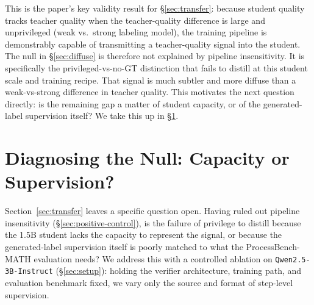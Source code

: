 \documentclass{article}
\begin{document}
This is the paper's key validity result for \S\ref{sec:transfer}: because
student quality tracks teacher quality when the teacher-quality difference
is large and unprivileged (weak vs.\ strong labeling model), the training
pipeline is demonstrably capable of transmitting a teacher-quality signal
into the student. The null in \S\ref{sec:diffuse} is therefore not explained
by pipeline insensitivity. It is specifically the privileged-vs-no-GT
distinction that fails to distill at this student scale and training recipe.
That signal is much subtler and more diffuse than a weak-vs-strong difference
in teacher quality. This motivates the next question directly: is the remaining gap a
matter of student capacity, or of the generated-label supervision itself?
We take this up in \S\ref{sec:mismatch}.

\section{Diagnosing the Null: Capacity or Supervision?}
\label{sec:mismatch}

Section~\ref{sec:transfer} leaves a specific question open. Having ruled out
pipeline insensitivity (\S\ref{sec:positive-control}), is the failure of
privilege to distill because the 1.5B student lacks the capacity to
represent the signal, or because the generated-label supervision itself is
poorly matched to what the ProcessBench-MATH evaluation needs? We address
this with a controlled ablation on \texttt{Qwen2.5-3B-Instruct}
(\S\ref{sec:setup}): holding the verifier architecture, training path, and
evaluation benchmark fixed, we vary only the source and format of step-level
supervision.
\end{document}
